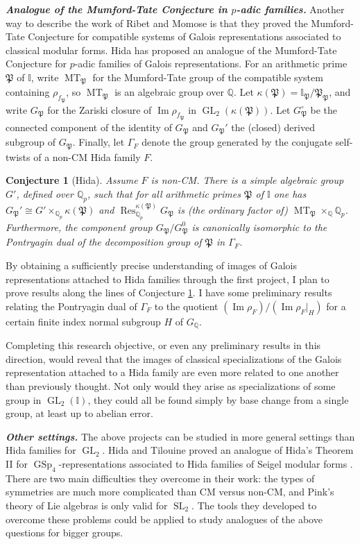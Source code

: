 \documentclass[12pt]{article}
\newcommand{\I}{\mathbb{I}}
\newcommand{\Pp}{\mathfrak{P}}
\newcommand{\Q}{\mathbb{Q}}
\newtheorem{conj}{Conjecture}
\theoremstyle{definition}
\DeclareMathOperator{\GL}{GL}
\DeclareMathOperator{\GSp}{GSp}
\DeclareMathOperator{\im}{Im}
\DeclareMathOperator{\MT}{MT}
\DeclareMathOperator{\Res}{Res}
\DeclareMathOperator{\SL}{SL}
\begin{document}
\textit{\textbf{Analogue of the Mumford-Tate Conjecture in $p$-adic families.}}  Another way to describe the work of Ribet and Momose is that they proved the Mumford-Tate Conjecture for compatible systems of Galois representations associated to classical modular forms.  Hida has proposed an analogue of the Mumford-Tate Conjecture for $p$-adic families of Galois representations.  For an arithmetic prime $\Pp$ of $\I$, write $\MT_\Pp$ for the Mumford-Tate group of the compatible system containing $\rho_{f_\Pp}$, so $\MT_\Pp$ is an algebraic group over $\Q$.  Let $\kappa(\Pp) = \I_\Pp/\Pp_\Pp$, and write $G_\Pp$ for the Zariski closure of $\im \rho_{f_\Pp}$ in $\GL_2(\kappa(\Pp))$.  Let $G_\Pp^\circ$ be the connected component of the identity of $G_\Pp$ and $G_\Pp'$ the (closed) derived subgroup of $G_\Pp$.  Finally, let $\Gamma_F$ denote the group generated by the conjugate self-twists of a non-CM Hida family $F$.

\begin{conj}[Hida]\label{p-adic MT}
Assume $F$ is non-CM.  There is a simple algebraic group $G'$, defined over $\Q_p$, such that for all arithmetic primes $\Pp$ of $\I$ one has $G_\Pp' \cong G' \times_{\Q_p} \kappa(\Pp)$ and $\Res_{\Q_p}^{\kappa(\Pp)} G_\Pp$ is (the ordinary factor of) $\MT_\Pp \times_\Q \Q_p$.  Furthermore, the component group $G_\Pp/G_\Pp^0$ is canonically isomorphic to the Pontryagin dual of the decomposition group of $\Pp$ in $\Gamma_F$.
\end{conj} 

By obtaining a sufficiently precise understanding of images of Galois representations attached to Hida families through the first project, I plan to prove results along the lines of Conjecture \ref{p-adic MT}.  I have some preliminary results relating the Pontryagin dual of $\Gamma_F$ to the quotient $(\im \rho_F)/(\im \rho_F|_H)$ for a certain finite index normal subgroup $H$ of $G_\Q$.

Completing this research objective, or even any preliminary results in this direction, would reveal that the images of classical specializations of the Galois representation attached to a Hida family are even more related to one another than previously thought.  Not only would they arise as specializations of some group in $\GL_2(\I)$, they could all be found simply by base change from a single group, at least up to abelian error.

\textit{\textbf{Other settings.}}  The above projects can be studied in more general settings than Hida families for $\GL_2$.  Hida and Tilouine proved an analogue of Hida's Theorem II \cite{Hida15} for $\GSp_4$-representations associated to Hida families of Seigel modular forms \cite{HidaTilouine15}.  There are two main difficulties they overcome in their work: the types of symmetries are much more complicated than CM versus non-CM, and Pink's theory of Lie algebras is only valid for $\SL_2$.  The tools they developed to overcome these problems could be applied to study analogues of the above questions for bigger groups.  
\end{document}
